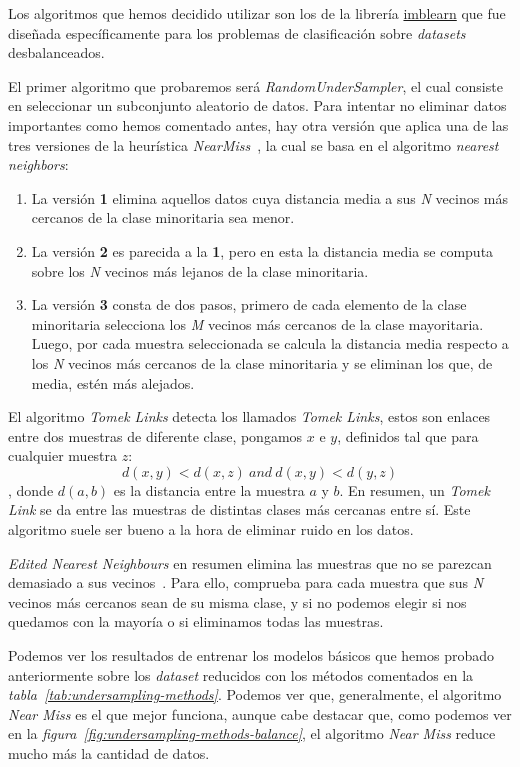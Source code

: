 Los algoritmos que hemos decidido utilizar son los de la librería \href{https://imbalanced-learn.org/stable/}{imblearn} que fue diseñada específicamente para los problemas de clasificación sobre \textit{datasets} desbalanceados.\ \cite{3Undersa98:online}

El primer algoritmo que probaremos será \textit{RandomUnderSampler}, el cual consiste en seleccionar un subconjunto aleatorio de datos. Para intentar no eliminar datos importantes como hemos comentado antes, hay otra versión que aplica una de las tres versiones de la heurística \textit{NearMiss}\ \cite{3Undersa98:online}, la cual se basa en el algoritmo \textit{nearest neighbors}:

\begin{enumerate}
    \item La versión \textbf{1} elimina aquellos datos cuya distancia media a sus \textit{N} vecinos más cercanos de la clase minoritaria sea menor.
    \item La versión \textbf{2} es parecida a la \textbf{1}, pero en esta la distancia media se computa sobre los \textit{N} vecinos más lejanos de la clase minoritaria.
    \item La versión \textbf{3} consta de dos pasos, primero de cada elemento de la clase minoritaria selecciona los \textit{M} vecinos más cercanos de la clase mayoritaria. Luego, por cada muestra seleccionada se calcula la distancia media respecto a los \textit{N} vecinos más cercanos de la clase minoritaria y se eliminan los que, de media, estén más alejados.
\end{enumerate}

El algoritmo \textit{Tomek Links} detecta los llamados \textit{Tomek Links}, estos son enlaces entre dos muestras de diferente clase, pongamos \(x\) e \(y\), definidos tal que para cualquier muestra \(z\): 
\[d(x,y) < d(x,z)\ and\ d(x,y) < d(y,z)\], donde \(d(a, b)\) es la distancia entre la muestra \(a\) y \(b\). En resumen, un \textit{Tomek Link} se da entre las muestras de distintas clases más cercanas entre sí. Este algoritmo suele ser bueno a la hora de eliminar ruido en los datos.

\textit{Edited Nearest Neighbours} en resumen elimina las muestras que no se parezcan demasiado a sus vecinos\ \cite{Wil72}. Para ello, comprueba para cada muestra que sus \textit{N} vecinos más cercanos sean de su misma clase, y si no podemos elegir si nos quedamos con la mayoría o si eliminamos todas las muestras.

Podemos ver los resultados de entrenar los modelos básicos que hemos probado anteriormente sobre los \textit{dataset} reducidos con los métodos comentados en la \textit{tabla\ \ref{tab:undersampling-methods}}. Podemos ver que, generalmente, el algoritmo \textit{Near Miss} es el que mejor funciona, aunque cabe destacar que, como podemos ver en la \textit{figura\ \ref{fig:undersampling-methods-balance}}, el algoritmo \textit{Near Miss} reduce mucho más la cantidad de datos.


